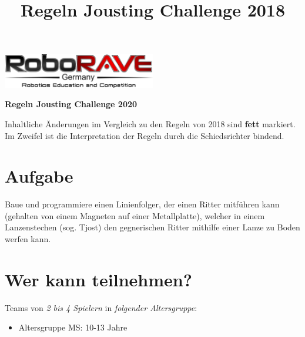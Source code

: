\documentclass[a4paper,12pt]{article}
\begin{document}
\title{Regeln Jousting Challenge 2018}

 \begin{center}
\includegraphics[width=0.5\textwidth]{logo.png}

\huge                      %
\bfseries                   %
Regeln Jousting Challenge 2020
  \end{center}
Inhaltliche Änderungen im Vergleich zu den Regeln von 2018 sind \textbf{fett} markiert. Im Zweifel ist die Interpretation der Regeln durch die Schiedsrichter bindend.
\section{Aufgabe}
Baue und programmiere einen Linienfolger, der einen Ritter mitführen kann
(gehalten von einem Magneten auf einer Metallplatte), welcher in einem
Lanzenstechen (sog. Tjost) den gegnerischen Ritter mithilfe einer
Lanze zu Boden werfen kann.
\section{Wer kann teilnehmen?}
Teams von \emph{2 bis 4 Spielern} in \emph{folgender Altersgruppe}:
\begin{itemize}
	\item Altersgruppe MS: 10-13 Jahre
\end{itemize}
\end{document}

